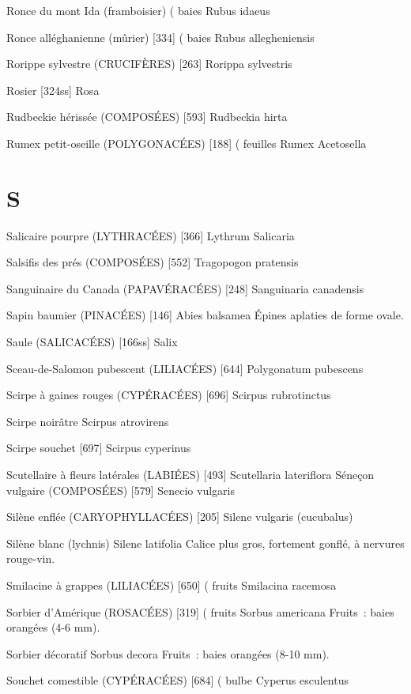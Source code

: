 \documentclass[book,12pt,a4paper,onecolumn,openany]{memoir}
\begin{document}
Ronce du mont Ida (framboisier)				( baies
				Rubus idaeus


Ronce alléghanienne (mûrier)  [334]				( baies
				Rubus allegheniensis

Rorippe sylvestre (CRUCIFÈRES)  [263]
				Rorippa sylvestris

Rosier  [324ss]
				Rosa

Rudbeckie hérissée (COMPOSÉES)  [593]
				Rudbeckia hirta

Rumex petit-oseille (POLYGONACÉES)  [188]		( feuilles
				Rumex Acetosella

\chapter*{S}

Salicaire pourpre (LYTHRACÉES)  [366]
				Lythrum Salicaria

Salsifis des prés (COMPOSÉES)  [552]
				Tragopogon pratensis


Sanguinaire du Canada (PAPAVÉRACÉES)  [248]
				Sanguinaria canadensis

Sapin baumier (PINACÉES) [146]
				Abies balsamea
Épines aplaties de forme ovale.

Saule (SALICACÉES)  [166ss]
				Salix

Sceau-de-Salomon pubescent (LILIACÉES)  [644]
				Polygonatum pubescens

Scirpe à gaines rouges (CYPÉRACÉES)  [696]
				Scirpus rubrotinctus

Scirpe noirâtre
				Scirpus atrovirens

Scirpe souchet  [697]
				Scirpus cyperinus

Scutellaire à fleurs latérales (LABIÉES)  [493]
				Scutellaria lateriflora
Séneçon vulgaire (COMPOSÉES)  [579]
				Senecio vulgaris

Silène enflée (CARYOPHYLLACÉES)  [205]
				Silene vulgaris (cucubalus)

Silène blanc (lychnis)
				Silene latifolia
Calice plus gros, fortement gonflé, à nervures rouge-vin.

Smilacine à grappes (LILIACÉES)  [650]			( fruits
				Smilacina racemosa

Sorbier d’Amérique (ROSACÉES)  [319]			( fruits
				Sorbus americana
Fruits : baies orangées (4-6 mm).

Sorbier décoratif
				Sorbus decora
Fruits : baies orangées (8-10 mm).

Souchet comestible (CYPÉRACÉES)  [684]			( bulbe
				Cyperus esculentus
\end{document}
